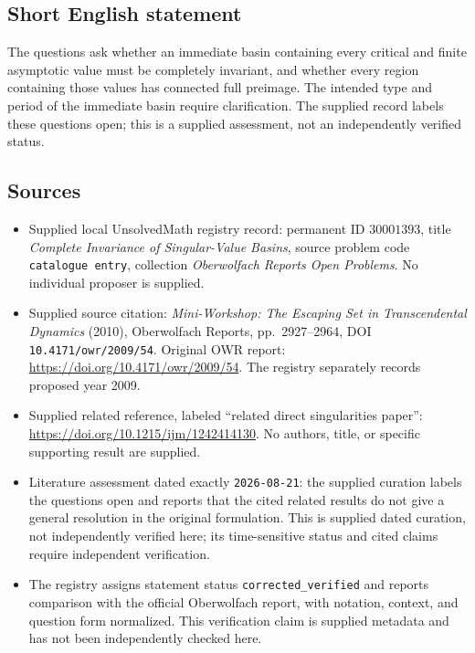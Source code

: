 \documentclass[11pt]{article}
\begin{document}
\subsection{Short English statement}
The questions ask whether an immediate basin containing every critical and finite asymptotic value must be completely invariant, and whether every region containing those values has connected full preimage. The intended type and period of the immediate basin require clarification. The supplied record labels these questions open; this is a supplied assessment, not an independently verified status.
\subsection{Sources}
\begin{itemize}
\item Supplied local UnsolvedMath registry record: permanent ID \(30001393\), title \emph{Complete Invariance of Singular-Value Basins}, source problem code \texttt{catalogue entry}, collection \emph{Oberwolfach Reports Open Problems}. No individual proposer is supplied.
\item Supplied source citation: \emph{Mini-Workshop: The Escaping Set in Transcendental Dynamics} (2010), Oberwolfach Reports, pp.~2927--2964, DOI \texttt{10.4171/owr/2009/54}. Original OWR report: \url{https://doi.org/10.4171/owr/2009/54}. The registry separately records proposed year 2009.
\item Supplied related reference, labeled ``related direct singularities paper'': \url{https://doi.org/10.1215/ijm/1242414130}. No authors, title, or specific supporting result are supplied.
\item Literature assessment dated exactly \texttt{2026-08-21}: the supplied curation labels the questions open and reports that the cited related results do not give a general resolution in the original formulation. This is supplied dated curation, not independently verified here; its time-sensitive status and cited claims require independent verification.
\item The registry assigns statement status \texttt{corrected\_verified} and reports comparison with the official Oberwolfach report, with notation, context, and question form normalized. This verification claim is supplied metadata and has not been independently checked here.
\end{itemize}
\end{document}
